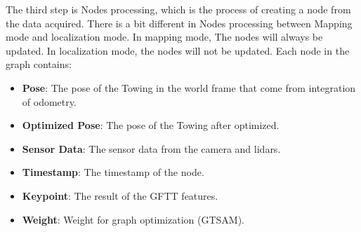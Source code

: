 \documentclass[conference]{IEEEtran}
\begin{document}
\par    
The third step is Nodes processing, which is the process of creating a node from the data acquired. There is a bit different in Nodes processing between Mapping mode and localization mode. In mapping mode, The nodes will always be updated. In localization mode, the nodes will not be updated. Each node in the graph contains: 
\begin{itemize}
	\item \textbf{Pose}: The pose of the Towing in the world frame that come from integration of odometry.
	\item \textbf{Optimized Pose}: The pose of the Towing after optimized.
	\item \textbf{Sensor Data}: The sensor data from the camera and lidars.
	\item \textbf{Timestamp}: The timestamp of the node.
	\item \textbf{Keypoint}: The result of the GFTT features. 
	\item \textbf{Weight}: Weight for graph optimization (GTSAM). 
\end{itemize}
\end{document}
